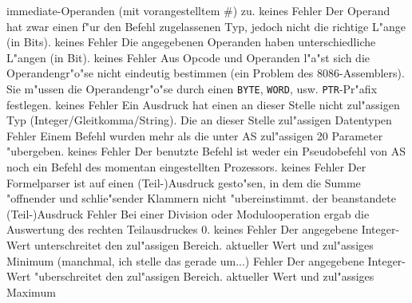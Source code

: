 \documentclass[12pt,a4paper,twoside]{report}
\newcommand{\tty}[1]{{\tt #1}}
\begin{document}
\begin{description}
{                immediate-Operanden (mit vorangestelltem \#) zu.}
               {keines}
               {Fehler}
               {Der Operand hat zwar einen f"ur den Befehl
                zugelassenen Typ, jedoch nicht die richtige L"ange (in
                Bits).}
               {keines}
               {Fehler}
               {Die angegebenen Operanden haben unterschiedliche
                L"angen (in Bit).}
               {keines}
               {Fehler}
               {Aus Opcode und Operanden l"a"st sich die
                Operandengr"o"se nicht eindeutig bestimmen (ein Problem
                des 8086-Assemblers).  Sie m"ussen die Operandengr"o"se
                durch einen \tty{BYTE}, \tty{WORD}, usw. \tty{PTR}-Pr"afix
	        festlegen.}
               {keines}
               {Fehler}
               {Ein Ausdruck hat einen an dieser Stelle nicht
                zul"assigen Typ (Integer/Gleitkomma/String).}
               {Die an dieser Stelle zul"assigen Datentypen}
               {Fehler}
               {Einem Befehl wurden mehr als die unter AS
                zul"assigen 20 Parameter "ubergeben.}
               {keines}
               {Fehler}
               {Der benutzte Befehl ist weder ein Pseudobefehl
                von AS noch ein Befehl des momentan eingestellten
                Prozessors.}
               {keines}
               {Fehler}
               {Der Formelparser ist auf einen (Teil-)Ausdruck
                gesto"sen, in dem die Summe "offnender und schlie"sender
                Klammern nicht "ubereinstimmt.}
               {der beanstandete (Teil-)Ausdruck}
               {Fehler}
               {Bei einer Division oder Modulooperation ergab
                die Auswertung des rechten Teilausdruckes 0.}
               {keines}
               {Fehler}
               {Der angegebene Integer-Wert unterschreitet
                den zul"assigen Bereich.}
               {aktueller Wert und zul"assiges Minimum
	        (manchmal, ich stelle das gerade um...)}
               {Fehler}
               {Der angegebene Integer-Wert "uberschreitet
                den zul"assigen Bereich.}
               {aktueller Wert und zul"assiges Maximum
}
\end{description}
\end{document}
